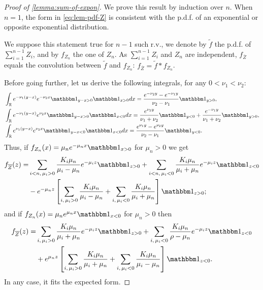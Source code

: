 \begin{proof}[{Proof of \cref{lemma:sum-of-expon}}]
We prove this result by induction over $n$. When $n=1$, the form in \cref{eq:lem-pdf-Z} is consistent with the p.d.f. of an exponential or opposite exponential distribution.

We suppose this statement true for $n-1$ such r.v., we denote by $\tilde f$ the p.d.f. of $\sum_{i=1}^{n-1}Z_i$, and by $f_{Z_n}$ the one of $Z_n$. As $\sum_{i=1}^{n-1}Z_i$ and $Z_n$ are independent, $f_{\overline{Z}}$ equals the convolution between $\tilde f$ and $f_{Z_n}$: $f_{\overline{Z}}=\tilde f\ast f_{Z_n}$.

Before going further, let us derive the following integrals, for any $0<\nu_1<\nu_2$:
\begin{align}
        \nonumber&\int_\RR e^{-\nu_1(y-x)}e^{-\nu_2 x}\indic_{y-x>0}\indic_{x>0}dx = \frac{e^{-\nu_2 y}-e^{-\nu_1 y}}{\nu_2-\nu_1}\indic_{y>0},\\
        &\int_\RR e^{-\nu_1(y-x)}e^{\nu_2 x}\indic_{y-x>0}\indic_{x<0} dx = \frac{e^{\nu_2y}}{\nu_1+\nu_2}\indic_{y<0} + \frac{e^{-\nu_1y}}{\nu_1+\nu_2}\indic_{y>0},\\
        &\int_\RR e^{\nu_1(y-x)}e^{\nu_2 x}\indic_{y-x<0}\indic_{x<0}dx = \frac{e^{\nu_1y} - e^{\nu_2y}}{\nu_2-\nu_1}\indic_{y<0}.\nonumber
    \end{align}
Thus, if $f_{Z_n}(x) = \mu_n e^{-\mu_n x}\indic_{x>0}$ for  $\mu_n>0$ we get
    \begin{align}
        f_{\overline{Z}}(z) =&  \sum_{i<n,\,\mu_i>0} \frac{K_i\mu_n}{\mu_i-\mu_n}e^{-\mu_i z}\indic_{z>0}  + \sum_{i<n,\,\mu_i<0}\frac{K_i\mu_n}{\mu_i+\mu_n}e^{-\mu_i z}\indic_{z<0}
        \\
        &- e^{-\mu_n z}\left[\sum_{i,\,\mu_i>0}\frac{K_i\mu_n}{\mu_i-\mu_n} + \sum_{i,\,\mu_i<0}\frac{K_i\mu_n}{\mu_i+\mu_n} \right]\indic_{z>0};\nonumber
    \end{align}
and if $f_{Z_n}(x) = \mu_n e^{\mu_n x}\indic_{x<0}$ for  $\mu_n>0$ then 
    \begin{align}
        f_{\overline{Z}}(z) =&  \sum_{i,\,\mu_i>0} \frac{K_i\mu_n}{\mu_i+\mu_n}e^{-\mu_i z}\indic_{z>0}  + \sum_{i,\,\mu_i<0}\frac{K_i\mu_n}{\rho-\mu_n}e^{-\mu_i z}\indic_{z<0}\\
        &+ e^{\mu_n z}\left[\sum_{i,\,\mu_i>0}\frac{K_i\mu_n}{\mu_i+\mu_n} + \sum_{i,\,\mu_i<0}\frac{K_i\mu_n}{\mu_i-\mu_n} \right]\indic_{z<0}.\nonumber
    \end{align}
In any case, it fits the expected form.
\end{proof}

